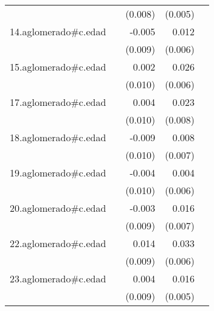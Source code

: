 {\begin{longtable}{l*{4}{D{.}{.}{-1}}}
            &                     &     (0.008)         &     (0.005)         &                     \\
\addlinespace
14.aglomerado#c.edad&                     &      -0.005         &       0.012\sym{*}  &                     \\
            &                     &     (0.009)         &     (0.006)         &                     \\
\addlinespace
15.aglomerado#c.edad&                     &       0.002         &       0.026\sym{***}&                     \\
            &                     &     (0.010)         &     (0.006)         &                     \\
\addlinespace
17.aglomerado#c.edad&                     &       0.004         &       0.023\sym{**} &                     \\
            &                     &     (0.010)         &     (0.008)         &                     \\
\addlinespace
18.aglomerado#c.edad&                     &      -0.009         &       0.008         &                     \\
            &                     &     (0.010)         &     (0.007)         &                     \\
\addlinespace
19.aglomerado#c.edad&                     &      -0.004         &       0.004         &                     \\
            &                     &     (0.010)         &     (0.006)         &                     \\
\addlinespace
20.aglomerado#c.edad&                     &      -0.003         &       0.016\sym{*}  &                     \\
            &                     &     (0.009)         &     (0.007)         &                     \\
\addlinespace
22.aglomerado#c.edad&                     &       0.014         &       0.033\sym{***}&                     \\
            &                     &     (0.009)         &     (0.006)         &                     \\
\addlinespace
23.aglomerado#c.edad&                     &       0.004         &       0.016\sym{**} &                     \\
            &                     &     (0.009)         &     (0.005)         &                     \\

\end{longtable}}
